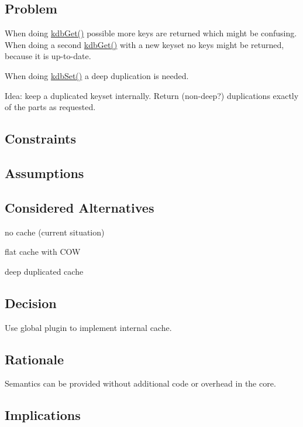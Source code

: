 \subsection*{Problem}

When doing \hyperlink{group__kdb_ga28e385fd9cb7ccfe0b2f1ed2f62453a1}{kdb\+Get()} possible more keys are returned which might be confusing. When doing a second \hyperlink{group__kdb_ga28e385fd9cb7ccfe0b2f1ed2f62453a1}{kdb\+Get()} with a new keyset no keys might be returned, because it is up-\/to-\/date.

When doing \hyperlink{group__kdb_ga11436b058408f83d303ca5e996832bcf}{kdb\+Set()} a deep duplication is needed.

Idea\+: keep a duplicated keyset internally. Return (non-\/deep?) duplications exactly of the parts as requested.

\subsection*{Constraints}

\subsection*{Assumptions}

\subsection*{Considered Alternatives}


\begin{DoxyItemize}
\item no cache (current situation)
\item flat cache with C\+OW
\item deep duplicated cache
\end{DoxyItemize}

\subsection*{Decision}

Use global plugin to implement internal cache.

\subsection*{Rationale}

Semantics can be provided without additional code or overhead in the core.

\subsection*{Implications}

